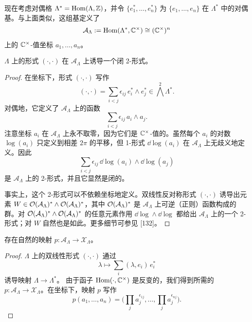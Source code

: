 现在考虑对偶格 $\Lambda^*=\operatorname{Hom}(\Lambda,\mathbb{Z})$，并令 $\{e_1^*,\dots,e_n^*\}$ 为 $\{e_1,\dots,e_n\}$ 在 $\Lambda^*$ 中的对偶基。与上面类似，这组基定义了
\[
\mathcal{A}_\Lambda:=\operatorname{Hom}(\Lambda^*,\mathbb{C}^\times)\cong(\mathbb{C}^\times)^n
\]
上的 $\mathbb{C}^\times$-值坐标 $a_1,\dots,a_n$。

\begin{proposition}[5.5]
$\Lambda$ 上的形式 $(\cdot,\cdot)$ 在 $\mathcal{A}_\Lambda$ 上诱导一个闭 2-形式。
\end{proposition}

\begin{proof}
在坐标下，形式 $(\cdot,\cdot)$ 写作
\[
(\cdot,\cdot)=\sum_{i<j}\epsilon_{ij}\,e_i^*\wedge e_j^*\in\bigwedge^{2}\Lambda^* .
\]
对偶地，它定义了 $\mathcal{A}_\Lambda$ 上的函数
\[
\sum_{i<j}\epsilon_{ij}\,a_i\wedge a_j .
\]
注意坐标 $a_i$ 在 $\mathcal{A}_\Lambda$ 上永不取零，因为它们是 $\mathbb{C}^\times$-值的。虽然每个 $a_i$ 的对数 $\log(a_i)$ 只定义到相差 $2\pi$ 的平移，但 1-形式 $\dd\log(a_i)$ 在 $\mathcal{A}_\Lambda$ 上无歧义地定义。因此
\[
\sum_{i<j}\epsilon_{ij}\,\dd\log(a_i)\wedge\dd\log(a_j)
\]
是 $\mathcal{A}_\Lambda$ 上的 2-形式，并且它显然是闭的。

事实上，这个 2-形式可以不依赖坐标地定义。双线性反对称形式 $(\cdot,\cdot)$ 诱导出元素 $W\in\mathcal{O}(\mathcal{A}_\Lambda)^*\wedge\mathcal{O}(\mathcal{A}_\Lambda)^*$，其中 $\mathcal{O}(\mathcal{A}_\Lambda)^*$ 是 $\mathcal{A}_\Lambda$ 上可逆（正则）函数构成的群。对 $\mathcal{O}(\mathcal{A}_\Lambda)^*\wedge\mathcal{O}(\mathcal{A}_\Lambda)^*$ 的任意元素作用 $\dd\log\wedge\dd\log$ 都给出 $\mathcal{A}_\Lambda$ 上的一个 2-形式；对 $W$ 自然也是如此。更多细节可参见 [132]。
\end{proof}

\begin{proposition}[5.6]
存在自然的映射 $p:\mathcal{A}_\Lambda\to\mathcal{X}_\Lambda$。
\end{proposition}

\begin{proof}
$\Lambda$ 上的双线性形式 $(\cdot,\cdot)$ 通过
\[
\lambda\longmapsto\sum_i(\lambda,e_i)\,e_i^*
\]
诱导映射 $\Lambda\to\Lambda^*$。
由于函子 $\operatorname{Hom}(\cdot,\mathbb{C}^\times)$ 是反变的，我们得到所需的 $p:\mathcal{A}_\Lambda\to\mathcal{X}_\Lambda$。在坐标下，映射 $p$ 写作
\[
p(a_1,\dots,a_n)=\Big(\prod_j a_j^{\epsilon_{1j}},\dots,\prod_j a_j^{\epsilon_{nj}}\Big).
\]
\end{proof}

